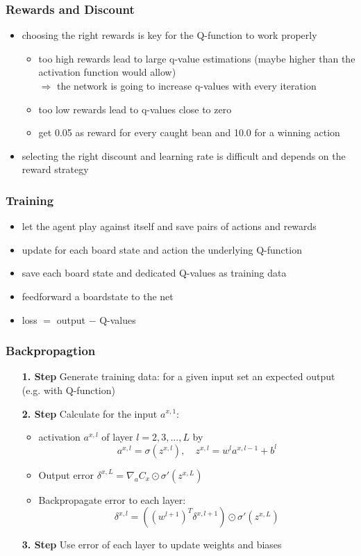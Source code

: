\documentclass{beamer}
\begin{document}
 \begin{frame}
 \frametitle{Rewards and Discount}
 \begin{itemize}
 	\item choosing the right rewards is key for the Q-function to work properly
 	\begin{itemize}
 		\item too high rewards lead to large q-value estimations (maybe higher than the activation function would allow)\\
 		$\Rightarrow$ the network is going to increase q-values with every iteration
 		\item too low rewards lead to q-values close to zero
 		\item get 0.05 as reward for every caught bean and 10.0 for a winning action
 	\end{itemize}
 \item selecting the right discount and learning rate is difficult and depends on the reward strategy
 \end{itemize}
\end{frame}
 
 \begin{frame}
 \frametitle{Training}
 \begin{itemize}
\item let the agent play against itself and save pairs of actions and rewards
\item update for each board state and action the underlying Q-function
\item save each board state and dedicated Q-values as training data
\item feedforward a boardstate to the net
\item loss $=$ output $-$ Q-values
\end{itemize}
 \end{frame}
 
  \begin{frame}
 \frametitle{Backpropagtion}
 \begin{itemize}
 \item[\textbf{1. Step}] Generate training data: for a given input set an expected output (e.g. with Q-function)
 \item[\textbf{2. Step}] Calculate for the input $a^{x,1}$:
 \begin{itemize}
 \item activation $a^{x,l}$ of layer $l=2,3,...,L$ by
 $$a^{x,l} = \sigma(z^{x,l}),\quad z^{x,l} = w^l a^{x,l-1} + b^l$$
 \item Output error $\delta^{x,L} = \nabla_a C_x \odot \sigma'(z^{x,L})$
 \item Backpropagate error to each layer: 
 $$\delta^{x,l} = ((w^{l+1})^T \delta^{x,l+1}) \odot \sigma' (z^{x,L})$$
 \end{itemize}
 \item[\textbf{3. Step}] Use error of each layer to update weights and biases 
 \end{itemize}
 \end{frame} 
 
\end{document}
